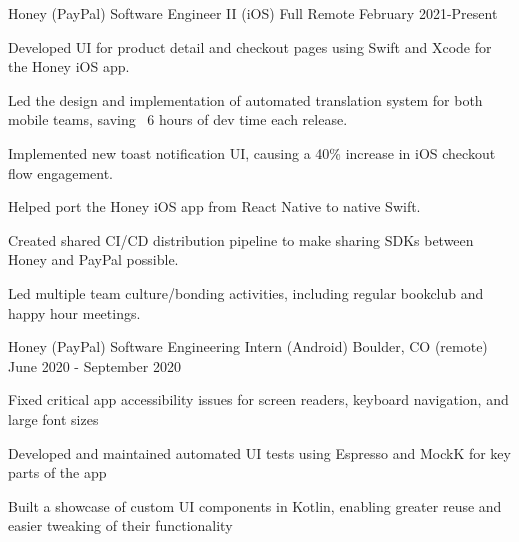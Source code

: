 \documentclass[12pt, a4paper]{awesome-cv}
\begin{document}
\makecvheader


\begin{cventries}

  \cventry
    {Honey (PayPal)}
    {Software Engineer II (iOS)}
    {Full Remote}
    {February 2021-Present}
    {
        \begin{cvitems}
            \item {Developed UI for product detail and checkout pages using Swift and Xcode for the Honey iOS app.}
            \item {Led the design and implementation of automated translation system for both mobile teams, saving ~6 hours of dev time each release.}
            \item {Implemented new toast notification UI, causing a 40\% increase in iOS checkout flow engagement.}
            \item {Helped port the Honey iOS app from React Native to native Swift.}
            \item {Created shared CI/CD distribution pipeline to make sharing SDKs between Honey and PayPal possible.}
            \item {Led multiple team culture/bonding activities, including regular bookclub and happy hour meetings.}
        \end{cvitems}
    }

  \cventry
    {Honey (PayPal)}
    {Software Engineering Intern (Android)}
    {Boulder, CO (remote)}
    {June 2020 - September 2020}
    {
        \begin{cvitems}
            \item {Fixed critical app accessibility issues for screen readers, keyboard navigation, and large font sizes}
            \item {Developed and maintained automated UI tests using Espresso and MockK for key parts of the app}
            \item {Built a showcase of custom UI components in Kotlin, enabling greater reuse and easier tweaking of their functionality}
        \end{cvitems}
    }




\end{cventries}
\end{document}
